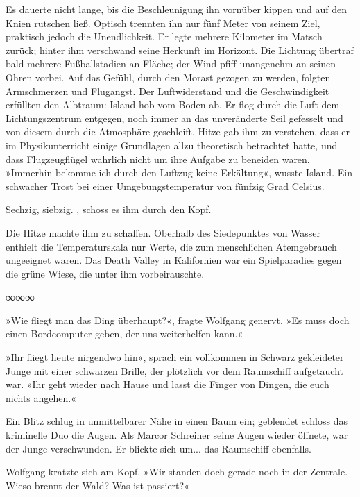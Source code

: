 Es dauerte nicht lange, bis die Beschleunigung ihn vornüber kippen und auf den Knien rutschen ließ. Optisch trennten ihn nur fünf Meter von seinem Ziel, praktisch jedoch die Unendlichkeit. Er legte mehrere Kilometer im Matsch zurück; hinter ihm verschwand seine Herkunft im Horizont. Die Lichtung übertraf bald mehrere Fußballstadien an Fläche; der Wind pfiff unangenehm an seinen Ohren vorbei. Auf das Gefühl, durch den Morast gezogen zu werden, folgten Armschmerzen und Flugangst. Der Luftwiderstand und die Geschwindigkeit erfüllten den Albtraum: Island hob vom Boden ab. Er flog durch die Luft dem Lichtungszentrum entgegen, noch immer an das unveränderte Seil gefesselt und von diesem durch die Atmosphäre geschleift. Hitze gab ihm zu verstehen, dass er im Physikunterricht einige Grundlagen allzu theoretisch betrachtet hatte, und dass Flugzeugflügel wahrlich nicht um ihre Aufgabe zu beneiden waren. »Immerhin bekomme ich durch den Luftzug keine Erkältung«, wusste Island. Ein schwacher Trost bei einer Umgebungstemperatur von fünfzig Grad Celsius.

Sechzig, siebzig. , schoss es ihm durch den Kopf. 

Die Hitze machte ihm zu schaffen. Oberhalb des Siedepunktes von Wasser enthielt die Temperaturskala nur Werte, die zum menschlichen Atemgebrauch ungeeignet waren. Das Death Valley in Kalifornien war ein Spielparadies gegen die grüne Wiese, die unter ihm vorbeirauschte.




\begin{center}
	∞∞∞
\end{center}

»Wie fliegt man das Ding überhaupt?«, fragte Wolfgang genervt. »Es muss doch einen Bordcomputer geben, der uns weiterhelfen kann.«

»Ihr fliegt heute nirgendwo hin«, sprach ein vollkommen in Schwarz gekleideter Junge mit einer schwarzen Brille, der plötzlich vor dem Raumschiff aufgetaucht war. »Ihr geht wieder nach Hause und lasst die Finger von Dingen, die euch nichts angehen.«

Ein Blitz schlug in unmittelbarer Nähe in einen Baum ein; geblendet schloss das kriminelle Duo die Augen. Als Marcor Schreiner seine Augen wieder öffnete, war der Junge verschwunden. Er blickte sich um... das Raumschiff ebenfalls.

Wolfgang kratzte sich am Kopf. »Wir standen doch gerade noch in der Zentrale. Wieso brennt der Wald? Was ist passiert?«

